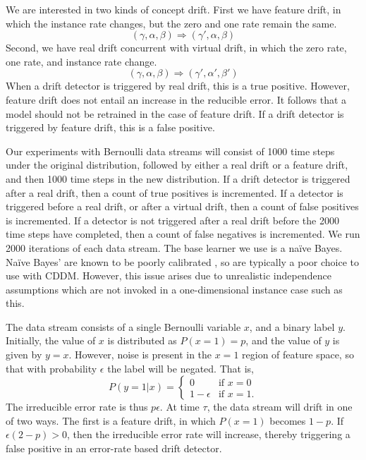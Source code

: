We are interested in two kinds of concept drift. First we have feature drift, in which the instance rate changes, but the zero and one rate remain the same.
\begin{equation}
  (\gamma,\alpha,\beta) \Rightarrow (\gamma',\alpha,\beta)
\end{equation}
Second, we have real drift concurrent with virtual drift, in which the zero rate, one rate, and instance rate change.
\begin{equation}
  (\gamma,\alpha,\beta) \Rightarrow (\gamma',\alpha',\beta')
\end{equation}
When a drift detector is triggered by real drift, this is a true positive. However, feature drift does not entail an increase in the reducible error. It follows that a model should not be retrained in the case of feature drift. If a drift detector is triggered by feature drift, this is a false positive. 

Our experiments with Bernoulli data streams will consist of 1000 time steps under the original distribution, followed by either a real drift or a feature drift, and then 1000 time steps in the new distribution. If a drift detector is triggered after a real drift, then a count of true positives is incremented. If a detector is triggered before a real drift, or after a virtual drift, then a count of false positives is incremented. If a detector is not triggered after a real drift before the 2000 time steps have completed, then a count of false negatives is incremented. We run 2000 iterations of each data stream. The base learner we use is a na\"{i}ve Bayes. Na\"{i}ve Bayes' are known to be poorly calibrated \cite{calibrating}, so are typically a poor choice to use with CDDM. However, this issue arises due to unrealistic independence assumptions which are not invoked in a one-dimensional instance case such as this.


The data stream consists of a single Bernoulli variable $x$, and a binary label $y$. Initially, the value of $x$ is distributed as $P(x=1)=p$, and the value of $y$ is given by $y=x$. However, noise is present in the $x=1$ region of feature space, so that with probability $\epsilon$ the label will be negated. That is,
\begin{equation}
	P(y=1|x) = \begin{cases} 0 & \text{if $x=0$} \\ 1-\epsilon & \text{if $x=1$}. \end{cases}
\end{equation}
The irreducible error rate is thus $p\epsilon$. At time $\tau$, the data stream will drift in one of two ways. The first is a feature drift, in which $P(x=1)$ becomes $1-p$. If $\epsilon(2-p)>0$, then the irreducible error rate will increase, thereby triggering a false positive in an error-rate based drift detector. 

